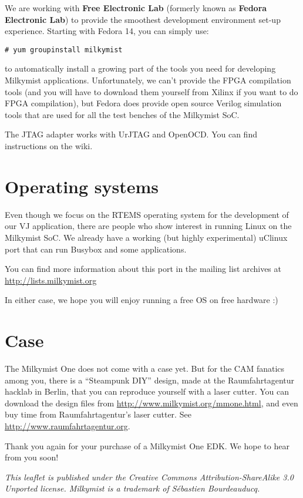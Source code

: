 \documentclass{leaflet}
\begin{document}
We are working with \textbf{Free Electronic Lab} (formerly known as \textbf{Fedora Electronic Lab}) to provide the smoothest development environment set-up experience. Starting with Fedora 14, you can simply use:

\begin{verbatim}
# yum groupinstall milkymist
\end{verbatim}

to automatically install a growing part of the tools you need for developing Milkymist applications. Unfortunately, we can't provide the FPGA compilation tools (and you will have to download them yourself from Xilinx if you want to do FPGA compilation), but Fedora does provide open source Verilog simulation tools that are used for all the test benches of the Milkymist SoC.

The JTAG adapter works with UrJTAG and OpenOCD. You can find instructions on the wiki.

\section{Operating systems}
Even though we focus on the RTEMS operating system for the development of our VJ application, there are people who show interest in running Linux on the Milkymist SoC. We already have a working (but highly experimental) uClinux port that can run Busybox and some applications.

You can find more information about this port in the mailing list archives at \url{http://lists.milkymist.org}

In either case, we hope you will enjoy running a free OS on free hardware :)

\section{Case}
The Milkymist One does not come with a case yet. But for the CAM fanatics among you, there is a ``Steampunk DIY'' design, made at the Raumfahrtagentur hacklab in Berlin, that you can reproduce yourself with a laser cutter. You can download the design files from \url{http://www.milkymist.org/mmone.html}, and even buy time from Raumfahrtagentur's laser cutter. See \url{http://www.raumfahrtagentur.org}.

Thank you again for your purchase of a Milkymist One EDK. We hope to hear from you soon!

\textit{This leaflet is published under the Creative Commons Attribution-ShareAlike 3.0 Unported license. Milkymist is a trademark of S\'ebastien Bourdeauducq.}
\end{document}
